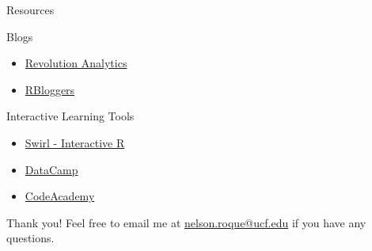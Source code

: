 \documentclass[
  ignorenonframetext,
]{beamer}
\providecommand{\tightlist}{%
  \setlength{\itemsep}{0pt}\setlength{\parskip}{0pt}}
\begin{document}
\begin{frame}{Resources}
\protect\hypertarget{resources-3}{}
\begin{block}{Blogs}
\protect\hypertarget{blogs}{}
\begin{itemize}
\tightlist
\item
  \href{https://blog.revolutionanalytics.com/}{Revolution Analytics}
\item
  \href{https://www.r-bloggers.com/}{RBloggers}
\end{itemize}
\end{block}

\begin{block}{Interactive Learning Tools}
\protect\hypertarget{interactive-learning-tools}{}
\begin{itemize}
\tightlist
\item
  \href{https://swirlstats.com/}{Swirl - Interactive R}
\item
  \href{https://www.datacamp.com/courses/free-introduction-to-r}{DataCamp}
\item
  \href{https://www.codecademy.com/catalog/language/r}{CodeAcademy}
\end{itemize}
\end{block}
\end{frame}

\begin{frame}{Thank you!}
\protect\hypertarget{thank-you}{}
Feel free to email me at \url{nelson.roque@ucf.edu} if you have any
questions.
\end{frame}
\end{document}
